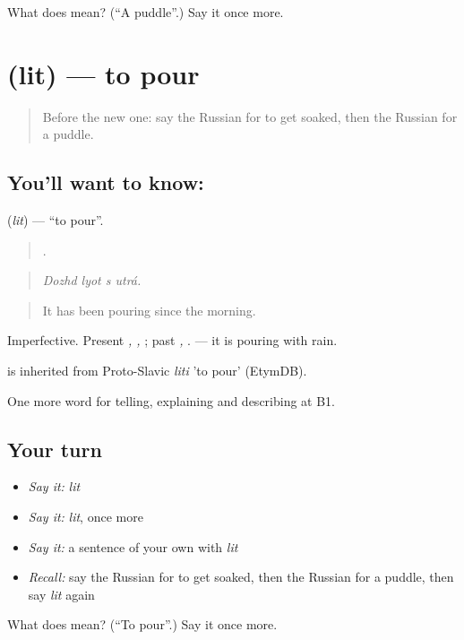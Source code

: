 \begin{tcolorbox}[breakable,colback=teal!4,colframe=teal!35!black,title={Before you move on}]
What does  mean? (\textquotedblleft{}A puddle\textquotedblright{}.) Say it once more.
\end{tcolorbox}
\section[\texorpdfstring{\ru{лить} (lit)}{лить (lit)}]{ (lit) — to pour}

\label{lesson:RU-C465-lit}



\begin{quote}
Before the new one: say the Russian for to get soaked, then the Russian for a puddle.
\end{quote}

\subsection*{You'll want to know: }
\textbf{} (\emph{lit}) — \textquotedblleft{}to pour\textquotedblright{}.

\begin{quote}
   .
\end{quote}

\begin{quote}
\emph{Dozhd lyot s utrá.}
\end{quote}

\begin{quote}
It has been pouring since the morning.
\end{quote}

Imperfective. Present \emph{, , }; past \emph{, }. \emph{   } — it is pouring with rain.

\begin{cousinweb}
\emph{} is inherited from Proto-Slavic \emph{liti} 'to pour' (EtymDB).
\end{cousinweb}

\begin{grammarlens}[title={What you've built}]
One more word for telling, explaining and describing at B1.
\end{grammarlens}

\subsection*{Your turn}
\begin{itemize}
\raggedright
  \item \emph{Say it:} \emph{lit}
  \item \emph{Say it:} \emph{lit}, once more
  \item \emph{Say it:} a sentence of your own with \emph{lit}
  \item \emph{Recall:} say the Russian for to get soaked, then the Russian for a puddle, then say \emph{lit} again
\end{itemize}

\begin{tcolorbox}[breakable,colback=teal!4,colframe=teal!35!black,title={Before you move on}]
What does  mean? (\textquotedblleft{}To pour\textquotedblright{}.) Say it once more.
\end{tcolorbox}
